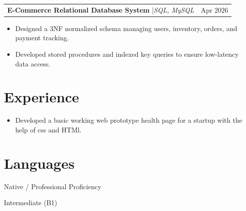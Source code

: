 \documentclass[11pt,a4paper]{article}
\begin{document}
\begin{tabularx}{\textwidth}{@{}X r@{}}
    \textbf{E-Commerce Relational Database System} \quad|\quad \textit{SQL, MySQL} & Apr 2026 \\
\end{tabularx}
\begin{itemize}
    \item Designed a 3NF normalized schema managing users, inventory, orders, and payment tracking.
    \item Developed stored procedures and indexed key queries to ensure low-latency data access.
\end{itemize}

\vspace{0.4em}



\section{Experience}

\begin{itemize}
    \item Developed a basic working web prototype health page for a startup with the help of css and HTMl.
\end{itemize}



\section{Languages}

\begin{description}[font=\normalfont\bfseries, leftmargin=0pt, style=sameline, itemsep=2pt]
    \item[English:] Native / Professional Proficiency
    \item[German:] Intermediate (B1)
\end{description}
\end{document}
